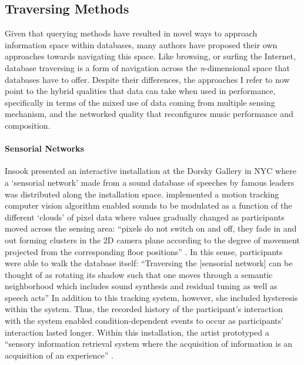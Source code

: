\documentclass[
]{book}
\begin{document}
\subsection{Traversing Methods}

Given that querying methods have resulted in novel ways to approach information space within databases, many authors have proposed their own approaches towards navigating this space. Like browsing, or surfing the Internet, database traversing is a form of navigation across the \textit{n}-dimensional space that databases have to offer. Despite their differences, the approaches I refer to now point to the hybrid qualities that data can take when used in performance, specifically in terms of the mixed use of data coming from multiple sensing mechanism, and the networked quality that reconfigures music performance and composition.

\paragraph{Sensorial Networks}
Insook \textcite{icmc/bbp2372.2000.146} presented an interactive installation \parencite{Cho00:Voi} at the Dorsky Gallery in NYC where a `sensorial network' made from a sound database of speeches by famous leaders was distributed along the installation space. \citeauthor{icmc/bbp2372.2000.146} implemented a motion tracking computer vision algorithm enabled sounds to be modulated as a function of the different `clouds' of pixel data where values gradually changed as participants moved across the sensing area: ``pixels do not switch on and off, they fade in and out forming clusters in the 2D camera plane according to the degree of movement projected from the corresponding floor positions'' \parencite[4]{icmc/bbp2372.2000.146}. In this sense, participants were able to walk the database itself: ``Traversing the [sensorial network] can be thought of as rotating its shadow such that one moves through a semantic neighborhood which includes sound synthesis and residual tuning as well as speech acts'' \parencite[3]{icmc/bbp2372.2000.146}	In addition to this tracking system, however, she included hysteresis within the system. Thus, the recorded history of the participant's interaction with the system enabled condition-dependent events to occur as participants' interaction lasted longer. Within this installation, the artist prototyped a ``sensory information retrieval system where the acquisition of information is an acquisition of an experience'' \parencite[1]{icmc/bbp2372.2000.146}.
\end{document}
